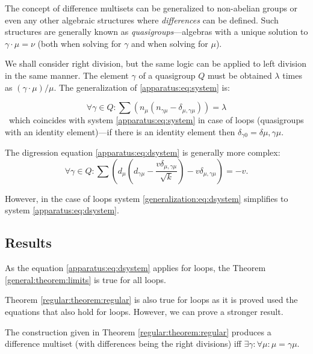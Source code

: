 The concept of difference multisets can be generalized to non-abelian groups or even any other algebraic structures where \emph{differences} can be defined. Such structures are generally known as \emph{quasigroups}---algebras with a unique solution to $\gamma\cdot\mu=\nu$ (both when solving for $\gamma$ and when solving for $\mu$).

We shall consider right division, but the same logic can be applied to left division in the same manner. The element $\gamma$ of a quasigroup $Q$ must be obtained $\lambda$ times as $(\gamma\cdot\mu)/\mu$. The generalization of \eqref{apparatus:eq:system} is:

    \begin{equation}
        \label{generalization:eq:system}
        \forall \gamma \in Q \colon \sum (n_\mu(n_{\gamma\mu}-\delta_{\mu,\gamma\mu})) = \lambda
    \end{equation}\
which coincides with system \eqref{apparatus:eq:system} in case of loops (quasigroups with an identity element)---if there is an identity element then $\delta_{\gamma0}=\delta{\mu,\gamma\mu}$.

The digression equation \eqref{apparatus:eq:dsystem} is generally more complex:
    \begin{equation}
        \label{generalization:eq:dsystem}
        \forall \gamma \in Q \colon \sum (d_\mu (d_{\gamma\mu}-\frac{v\delta_{\mu,\gamma\mu}}{\sqrt k})-v\delta_{\mu,\gamma\mu}) = -v.
    \end{equation}

However, in the case of loops system \eqref{generalization:eq:dsystem} simplifies to system \eqref{apparatus:eq:dsystem}.

\subsection{Results}

As the equation \eqref{apparatus:eq:dsystem} applies for loops, the Theorem \ref{general:theorem:limits} is true for all loops.

Theorem \ref{regular:theorem:regular} is also true for loops as it is proved used the equations that also hold for loops. However, we can prove a stronger result.

\begin{theorem}
        \label{generalization:theorem:regular}
        The construction given in Theorem \ref{regular:theorem:regular} produces a difference multiset (with differences being the right divisions) iff $\exists \gamma \colon \forall \mu \colon \mu=\gamma\mu$.
    \end{theorem}
    
